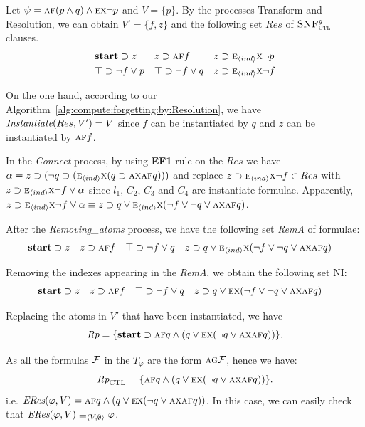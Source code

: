 \documentclass[runningheads]{llncs}
\newcommand{\tuple}[1]{{\langle{#1}\rangle}}
\newcommand{\start}{\textbf{start}}
\newcommand{\CTL}{\textrm{CTL}}
\newcommand{\NI}{\textrm{NI}}
\newcommand{\ALL}{\textsc{a}}
\newcommand{\EXIST}{\textsc{e}}
\newcommand{\NEXT}{\textsc{x}}
\newcommand{\FUTURE}{\textsc{f}}
\newcommand{\GLOBAL}{\textsc{g}}
\newcommand{\CTLsnf}{{\textsc{SNF}_{\textsc{ctl}}^g}}
\begin{document}
\begin{example}
Let $\psi=\ALL\FUTURE(p \wedge q) \wedge \EXIST \NEXT \neg p$ and $V=\{p\}$.
By the processes Transform and Resolution, we can obtain $V'=\{f,z\}$ and the following set $Res$ of $\CTLsnf$ clauses.
\begin{align*}
& \start \supset z && z \supset \ALL\FUTURE f && z \supset  \EXIST_{\tuple{ind}} \NEXT \neg p \\
& \top \supset \neg f \vee p && \top \supset \neg f \vee q && z \supset \EXIST_{\tuple{ind}} \NEXT \neg f
\end{align*}

On the one hand, according to our Algorithm~\ref{alg:compute:forgetting:by:Resolution}, we have $\emph{Instantiate}(Res,V')=V$ since $f$ can be instantiated by $q$ and $z$ can be instantiated by $\ALL\FUTURE f$. 

In the \emph{Connect} process, by using \textbf{EF1} rule on the $Res$ we have $\alpha=z \supset (\neg q \supset  (\EXIST_{\tuple{ind}}\NEXT (q \supset \ALL\NEXT \ALL\FUTURE q )))$ and replace $z \supset \EXIST_{\tuple{ind}} \NEXT \neg f \in Res$ with $z \supset \EXIST_{\tuple{ind}} \NEXT \neg f \vee \alpha$ since $l_1$, $C_2$, $C_3$ and $C_4$ are instantiate formulae.
Apparently, $z \supset \EXIST_{\tuple{ind}} \NEXT \neg f \vee \alpha \equiv z \supset q \vee \EXIST_{\tuple{ind}} \NEXT(\neg f \vee \neg q \vee \ALL\NEXT \ALL\FUTURE q)$.

After the \emph{Removing\_atoms} process, we have the following set \emph{RemA} of formulae:
\begin{align*}
& \start \supset z && z \supset \ALL\FUTURE f &&  \top \supset \neg f \vee q
&& z \supset q \vee \EXIST_{\tuple{ind}} \NEXT(\neg f \vee \neg q \vee \ALL\NEXT \ALL\FUTURE q)
\end{align*}

Removing the indexes appearing in the \emph{RemA}, we obtain the following set $\NI$:
 \begin{align*}
& \start \supset z && z \supset \ALL\FUTURE f &&  \top \supset \neg f \vee q
&& z \supset q \vee \EXIST \NEXT(\neg f \vee \neg q \vee \ALL\NEXT \ALL\FUTURE q)
\end{align*}

Replacing the atoms in $V'$ that have been instantiated, we have 
\[
\emph{Rp}= \{\start \supset  \ALL\FUTURE q \wedge (q \vee \EXIST \NEXT(\neg q \vee \ALL\NEXT \ALL\FUTURE q))\}.
\]

As all the formulas $\cal F$ in the $T_{\varphi}$ are the form $\ALL\GLOBAL \cal F$, hence we have: 
\[
\emph{Rp}_{\CTL} = \{\ALL\FUTURE q \wedge (q \vee \EXIST \NEXT(\neg q \vee \ALL\NEXT \ALL\FUTURE q))\}.
\]
i.e. $\emph{ERes}(\varphi, V) = \ALL\FUTURE q \wedge (q \vee \EXIST \NEXT(\neg q \vee \ALL\NEXT \ALL\FUTURE q))$.
In this case, we can easily check that $\emph{ERes}(\varphi, V) \equiv_{\tuple{V, \emptyset}} \varphi$.



\end{example}
\end{document}
